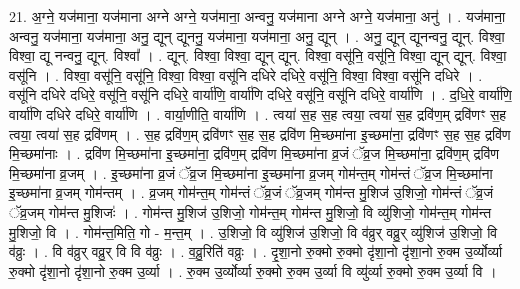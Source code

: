 \documentclass[17pt]{extarticle}
\begin{document}
21. अ॒ग्ने॒ यज॑माना॒ यज॑माना अग्ने अग्ने॒ यज॑माना॒ अन्वनु॒ यज॑माना अग्ने अग्ने॒ यज॑माना॒ अनु॑ । . यज॑माना॒ अन्वनु॒ यज॑माना॒ यज॑माना॒ अनु॒ द्यून् द्यूननु॒ यज॑माना॒ यज॑माना॒ अनु॒ द्यून् । . अनु॒ द्यून् द्यूनन्वनु॒ द्यून्. विश्वा॒ विश्वा॒ द्यू नन्वनु॒ द्यून्. विश्वा᳚ । . द्यून्. विश्वा॒ विश्वा॒ द्यून् द्यून्. विश्वा॒ वसू॑नि॒ वसू॑नि॒ विश्वा॒ द्यून् द्यून्. विश्वा॒ वसू॑नि । . विश्वा॒ वसू॑नि॒ वसू॑नि॒ विश्वा॒ विश्वा॒ वसू॑नि दधिरे दधिरे॒ वसू॑नि॒ विश्वा॒ विश्वा॒ वसू॑नि दधिरे । . वसू॑नि दधिरे दधिरे॒ वसू॑नि॒ वसू॑नि दधिरे॒ वार्या॑णि॒ वार्या॑णि दधिरे॒ वसू॑नि॒ वसू॑नि दधिरे॒ वार्या॑णि । . द॒धि॒रे॒ वार्या॑णि॒ वार्या॑णि दधिरे दधिरे॒ वार्या॑णि । . वार्या॒णीति॒ वार्या॑णि । . त्वया॑ स॒ह स॒ह त्वया॒ त्वया॑ स॒ह द्रवि॑ण॒म् द्रवि॑णꣳ स॒ह त्वया॒ त्वया॑ स॒ह द्रवि॑णम् । . स॒ह द्रवि॑ण॒म् द्रवि॑णꣳ स॒ह स॒ह द्रवि॑ण मि॒च्छमा॑ना इ॒च्छमा॑ना॒ द्रवि॑णꣳ स॒ह स॒ह द्रवि॑ण मि॒च्छमा॑नाः । . द्रवि॑ण मि॒च्छमा॑ना इ॒च्छमा॑ना॒ द्रवि॑ण॒म् द्रवि॑ण मि॒च्छमा॑ना व्र॒जं ॅव्र॒ज मि॒च्छमा॑ना॒ द्रवि॑ण॒म् द्रवि॑ण मि॒च्छमा॑ना व्र॒जम् । . इ॒च्छमा॑ना व्र॒जं ॅव्र॒ज मि॒च्छमा॑ना इ॒च्छमा॑ना व्र॒जम् गोम॑न्त॒म् गोम॑न्तं ॅव्र॒ज मि॒च्छमा॑ना इ॒च्छमा॑ना व्र॒जम् गोम॑न्तम् । . व्र॒जम् गोम॑न्त॒म् गोम॑न्तं ॅव्र॒जं ॅव्र॒जम् गोम॑न्त मु॒शिज॑ उ॒शिजो॒ गोम॑न्तं ॅव्र॒जं ॅव्र॒जम् गोम॑न्त मु॒शिजः॑ । . गोम॑न्त मु॒शिज॑ उ॒शिजो॒ गोम॑न्त॒म् गोम॑न्त मु॒शिजो॒ वि व्यु॑शिजो॒ गोम॑न्त॒म् गोम॑न्त मु॒शिजो॒ वि । . गोम॑न्त॒मिति॒ गो - म॒न्त॒म् । . उ॒शिजो॒ वि व्यु॑शिज॑ उ॒शिजो॒ वि व॑व्रुर् वव्रु॒र् व्यु॑शिज॑ उ॒शिजो॒ वि व॑व्रुः । . वि व॑व्रुर् वव्रु॒र् वि वि व॑व्रुः । . व॒व्रु॒रिति॑ वव्रुः । . दृ॒शा॒नो रु॒क्मो रु॒क्मो दृ॑शा॒नो दृ॑शा॒नो रु॒क्म उ॒र्व्योर्व्या रु॒क्मो दृ॑शा॒नो दृ॑शा॒नो रु॒क्म उ॒र्व्या । . रु॒क्म उ॒र्व्योर्व्या रु॒क्मो रु॒क्म उ॒र्व्या वि व्यु॑र्व्या रु॒क्मो रु॒क्म उ॒र्व्या वि । \newline
\end{document}
